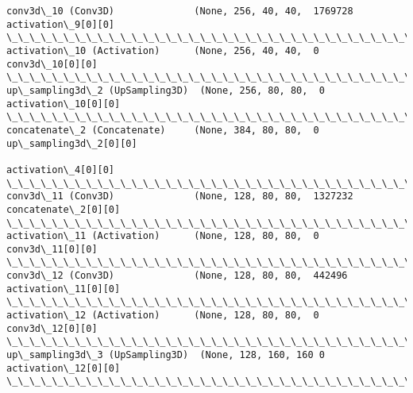 \documentclass[11pt]{article}
\begin{document}
\begin{Verbatim}[commandchars=\\\{\}]
conv3d\_10 (Conv3D)              (None, 256, 40, 40,  1769728     activation\_9[0][0]               
\_\_\_\_\_\_\_\_\_\_\_\_\_\_\_\_\_\_\_\_\_\_\_\_\_\_\_\_\_\_\_\_\_\_\_\_\_\_\_\_\_\_\_\_\_\_\_\_\_\_\_\_\_\_\_\_\_\_\_\_\_\_\_\_\_\_\_\_\_\_\_\_\_\_\_\_\_\_\_\_\_\_\_\_\_\_\_\_\_\_\_\_\_\_\_\_\_\_
activation\_10 (Activation)      (None, 256, 40, 40,  0           conv3d\_10[0][0]                  
\_\_\_\_\_\_\_\_\_\_\_\_\_\_\_\_\_\_\_\_\_\_\_\_\_\_\_\_\_\_\_\_\_\_\_\_\_\_\_\_\_\_\_\_\_\_\_\_\_\_\_\_\_\_\_\_\_\_\_\_\_\_\_\_\_\_\_\_\_\_\_\_\_\_\_\_\_\_\_\_\_\_\_\_\_\_\_\_\_\_\_\_\_\_\_\_\_\_
up\_sampling3d\_2 (UpSampling3D)  (None, 256, 80, 80,  0           activation\_10[0][0]              
\_\_\_\_\_\_\_\_\_\_\_\_\_\_\_\_\_\_\_\_\_\_\_\_\_\_\_\_\_\_\_\_\_\_\_\_\_\_\_\_\_\_\_\_\_\_\_\_\_\_\_\_\_\_\_\_\_\_\_\_\_\_\_\_\_\_\_\_\_\_\_\_\_\_\_\_\_\_\_\_\_\_\_\_\_\_\_\_\_\_\_\_\_\_\_\_\_\_
concatenate\_2 (Concatenate)     (None, 384, 80, 80,  0           up\_sampling3d\_2[0][0]            
                                                                 activation\_4[0][0]               
\_\_\_\_\_\_\_\_\_\_\_\_\_\_\_\_\_\_\_\_\_\_\_\_\_\_\_\_\_\_\_\_\_\_\_\_\_\_\_\_\_\_\_\_\_\_\_\_\_\_\_\_\_\_\_\_\_\_\_\_\_\_\_\_\_\_\_\_\_\_\_\_\_\_\_\_\_\_\_\_\_\_\_\_\_\_\_\_\_\_\_\_\_\_\_\_\_\_
conv3d\_11 (Conv3D)              (None, 128, 80, 80,  1327232     concatenate\_2[0][0]              
\_\_\_\_\_\_\_\_\_\_\_\_\_\_\_\_\_\_\_\_\_\_\_\_\_\_\_\_\_\_\_\_\_\_\_\_\_\_\_\_\_\_\_\_\_\_\_\_\_\_\_\_\_\_\_\_\_\_\_\_\_\_\_\_\_\_\_\_\_\_\_\_\_\_\_\_\_\_\_\_\_\_\_\_\_\_\_\_\_\_\_\_\_\_\_\_\_\_
activation\_11 (Activation)      (None, 128, 80, 80,  0           conv3d\_11[0][0]                  
\_\_\_\_\_\_\_\_\_\_\_\_\_\_\_\_\_\_\_\_\_\_\_\_\_\_\_\_\_\_\_\_\_\_\_\_\_\_\_\_\_\_\_\_\_\_\_\_\_\_\_\_\_\_\_\_\_\_\_\_\_\_\_\_\_\_\_\_\_\_\_\_\_\_\_\_\_\_\_\_\_\_\_\_\_\_\_\_\_\_\_\_\_\_\_\_\_\_
conv3d\_12 (Conv3D)              (None, 128, 80, 80,  442496      activation\_11[0][0]              
\_\_\_\_\_\_\_\_\_\_\_\_\_\_\_\_\_\_\_\_\_\_\_\_\_\_\_\_\_\_\_\_\_\_\_\_\_\_\_\_\_\_\_\_\_\_\_\_\_\_\_\_\_\_\_\_\_\_\_\_\_\_\_\_\_\_\_\_\_\_\_\_\_\_\_\_\_\_\_\_\_\_\_\_\_\_\_\_\_\_\_\_\_\_\_\_\_\_
activation\_12 (Activation)      (None, 128, 80, 80,  0           conv3d\_12[0][0]                  
\_\_\_\_\_\_\_\_\_\_\_\_\_\_\_\_\_\_\_\_\_\_\_\_\_\_\_\_\_\_\_\_\_\_\_\_\_\_\_\_\_\_\_\_\_\_\_\_\_\_\_\_\_\_\_\_\_\_\_\_\_\_\_\_\_\_\_\_\_\_\_\_\_\_\_\_\_\_\_\_\_\_\_\_\_\_\_\_\_\_\_\_\_\_\_\_\_\_
up\_sampling3d\_3 (UpSampling3D)  (None, 128, 160, 160 0           activation\_12[0][0]              
\_\_\_\_\_\_\_\_\_\_\_\_\_\_\_\_\_\_\_\_\_\_\_\_\_\_\_\_\_\_\_\_\_\_\_\_\_\_\_\_\_\_\_\_\_\_\_\_\_\_\_\_\_\_\_\_\_\_\_\_\_\_\_\_\_\_\_\_\_\_\_\_\_\_\_\_\_\_\_\_\_\_\_\_\_\_\_\_\_\_\_\_\_\_\_\_\_\_

\end{Verbatim}
\end{document}
